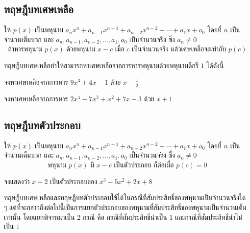 \newpage
\subsection{ทฤษฎีบทเศษเหลือ}
\begin{theorembox}
	ให้ $p(x)$ เป็นพหุนาม $a_n x^n + a_{n-1} x^{n-1} + a_{n-2} x^{n-2} + \cdots + a_1 x + a_0$ โดยที่ $n$ เป็นจำนวนเต็มบวก และ $a_n, a_{n-1}, a_{n-2}, \ldots, a_1, a_0$ เป็นจำนวนจริง ซึ่ง $a_n \neq 0$\\
	\[ \text{ถ้าหารพหุนาม $p(x)$ ด้วยพหุนาม $x-c$ เมื่อ $c$ เป็นจำนวนจริง แล้วเศษเหลือจะเท่ากับ $p(c)$}\]
\end{theorembox}

ทฤษฎีบทเศษเหลือทำให้สามารถหาเศษเหลือจากการหารพหุนามด้วยพหุนามดีกรี $1$ ได้ดังนี้

\begin{examplebox}
	จงหาเศษเหลือจากการหาร $9x^3 + 4x - 1$ ด้วย $x - \frac{1}{2}$
\end{examplebox}
\solution
\vspace{5cm}


\begin{examplebox}
	จงหาเศษเหลือจากการหาร $2x^4 - 7x^3 + x^2 + 7x - 3$ ด้วย $x + 1$
\end{examplebox}
\solution

\newpage
\subsection{ทฤษฎีบทตัวประกอบ}

\begin{theorembox}
	ให้ $p(x)$ เป็นพหุนาม $a_n x^n + a_{n-1} x^{n-1} + a_{n-2} x^{n-2} + \cdots + a_1 x + a_0$ โดยที่ $n$ เป็นจำนวนเต็มบวก และ $a_n, a_{n-1}, a_{n-2}, \ldots, a_1, a_0$ เป็นจำนวนจริง ซึ่ง $a_n \neq 0$
	\\
  \[\text{พหุนาม $p(x)$ มี $x-c$ เป็นตัวประกอบ ก็ต่อเมื่อ $p(c) = 0$}\]
\end{theorembox}

\begin{examplebox}
	จงแสดงว่า $x-2$ เป็นตัวประกอบของ $x^3 - 5x^2 + 2x + 8$
\end{examplebox}
\solution
\newpage

ทฤษฎีบทเศษเหลือและทฤษฎีบทตัวประกอบใช้ได้ในกรณีที่สัมประสิทธิ์ของพหุนามเป็นจำนวนจริงใด ๆ แต่ที่จะกล่าวถึงต่อไปนี้เป็นการแยกตัวประกอบของพหุนามที่สัมประสิทธิ์ของพหุนามเป็นจำนวนเต็มเท่านั้น โดยแยกพิจารณาเป็น 2 กรณี คือ กรณีที่สัมประสิทธิ์นำเป็น $1$ และกรณีที่สัมประสิทธิ์นำไม่เป็น $1$

